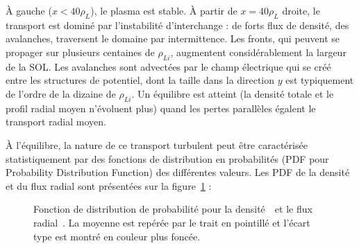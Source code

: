 \begin{refsection}
À gauche ($x<40 \rho_L$), le plasma est stable. À partir de $x=40 \rho_L$
droite, le transport est dominé par l'instabilité d'interchange : de forts flux de densité, des avalanches, traversent le domaine par intermittence.
Les fronts, qui peuvent se propager sur plusieurs centaines de
$\rho_{Li}$, augmentent considérablement la largeur de la SOL.
Les avalanches sont advectées par le champ électrique qui se créé entre les
structures de potentiel, dont la taille dans la direction $y$ est
typiquement de l'ordre de la dizaine de $\rho_{Li}$.
Un équilibre est atteint (la densité totale et le profil radial moyen
n'évoluent plus) quand les pertes parallèles égalent le transport radial moyen.

À l'équilibre, la nature de ce transport turbulent peut être
caractérisée statistiquement par des fonctions de distribution en probabilités
(PDF pour Probability Distribution Function) des différentes valeurs. Les PDF
de la densité et du flux radial sont présentées sur la figure~\ref{2-PDFBase} : 

\begin{figure}[!htbp]
    \centering
    \caption{Fonction de distribution de probabilité pour la
    densité~~et le flux
    radial~. La moyenne est repérée par le trait en
    pointillé et l'écart type est montré en couleur plus foncée.}
    \label{2-PDFBase}
\end{figure}


\end{refsection}
